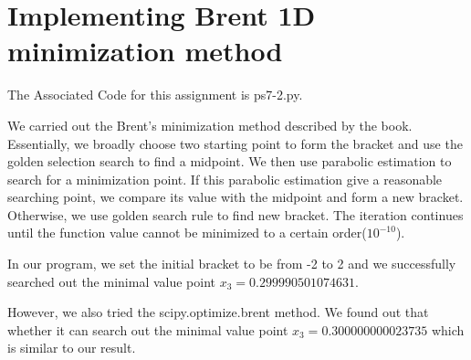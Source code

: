 \documentclass[letterpaper,12pt]{article}
\begin{document}
\section{Implementing Brent 1D minimization method}

The Associated Code for this assignment is ps7-2.py.

We carried out the Brent's minimization method described by the book. Essentially, we broadly choose two starting point to form the bracket and use the golden selection search to find a midpoint. We then use parabolic estimation to search for a minimization point. If this parabolic estimation give a reasonable searching point, we compare its value with the midpoint and form a new bracket. Otherwise, we use golden search rule to find new bracket. The iteration continues until the function value cannot be minimized to a certain order($10^{-10}$).

In our program, we set the initial bracket to be from -2 to 2 and we successfully searched out the minimal value point $x_3 = 0.299990501074631$.

However, we also tried the scipy.optimize.brent method. We found out that whether it can search out the minimal value point $x_3 = 0.300000000023735$ which is similar to our result.
\end{document}
